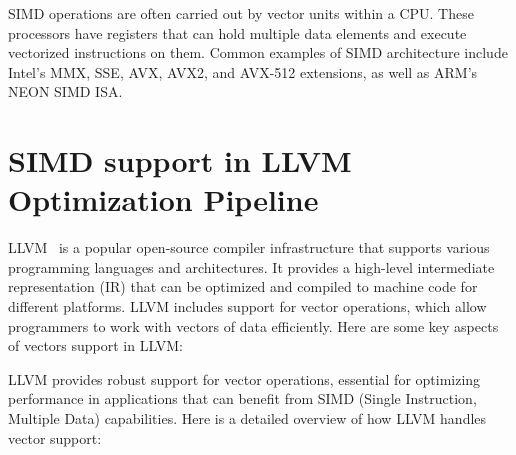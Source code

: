 SIMD operations are often carried out by vector units within a CPU.
These processors have registers that can hold multiple data elements
and execute vectorized instructions on them. Common examples of SIMD
architecture include Intel’s MMX, SSE, AVX, AVX2, and AVX-512
extensions, as well as ARM’s NEON SIMD ISA.


\section{SIMD support in LLVM Optimization Pipeline}
\label{sec:llvm-vectors}

LLVM~\cite{llvm} is a popular open-source compiler infrastructure that supports
various programming languages and architectures. It provides a
high-level intermediate representation (IR) that can be optimized and
compiled to machine code for different platforms. LLVM includes
support for vector operations, which allow programmers to work with
vectors of data efficiently. Here are some key aspects of vectors
support in LLVM:

LLVM provides robust support for vector operations, essential for
optimizing performance in applications that can benefit from SIMD
(Single Instruction, Multiple Data) capabilities. Here is a detailed
overview of how LLVM handles vector support:

